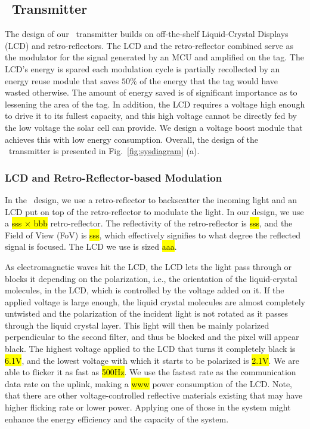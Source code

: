 \subsection{\vitag\ Transmitter}
The design of our \vitag\ transmitter builds on off-the-shelf Liquid-Crystal Displays (LCD) and retro-reflectors. The LCD and the retro-reflector combined serve as the modulator for the signal generated by an MCU and amplified on the tag. The LCD's energy is spared each modulation cycle is partially recollected by an energy reuse module that saves $50\%$ of the energy that the tag would have wasted otherwise. The amount of energy saved is of significant importance as to lessening the area of the tag. In addition, the LCD requires a voltage high enough to drive it to its fullest capacity, and this high voltage cannot be directly fed by the low voltage the solar cell can provide. We design a voltage boost module that achieves this with low energy consumption. Overall, the design of the \vitag\ transmitter is presented in Fig.~\ref{fig:sysdiagram} (a).

\subsubsection{LCD and Retro-Reflector-based Modulation}
In the \vitag\ design, we use a retro-reflector to backscatter the incoming light and an LCD put on top of the retro-reflector to modulate the light. In our design, we use a \hl{sss $\times$ bbb} retro-reflector. The reflectivity of the retro-reflector is \hl{sss}, and the Field of View (FoV) is \hl{sss}, which effectively signifies to what degree the reflected signal is focused. The LCD we use is sized \hl{aaa}. 

As electromagnetic waves hit the LCD, the LCD lets the light pass through or blocks it depending on the polarization, i.e., the orientation of the liquid-crystal molecules, in the LCD, which is controlled by the voltage added on it. If the applied voltage is large enough, the liquid crystal molecules are almost completely untwisted and the polarization of the incident light is not rotated as it passes through the liquid crystal layer. This light will then be mainly polarized perpendicular to the second filter, and thus be blocked and the pixel will appear black. The highest voltage applied to the LCD that turns it completely black is \hl{6.1V}, and the lowest voltage with which it starts to be polarized is \hl{2.1V}. We are able to flicker it as fast as \hl{500Hz}. We use the fastest rate as the communication data rate on the uplink, making a \hl{www} power consumption of the LCD. Note, that there are other voltage-controlled reflective materials existing that may have higher flicking rate or lower power. Applying one of those in the system might enhance the energy efficiency and the capacity of the system.  

